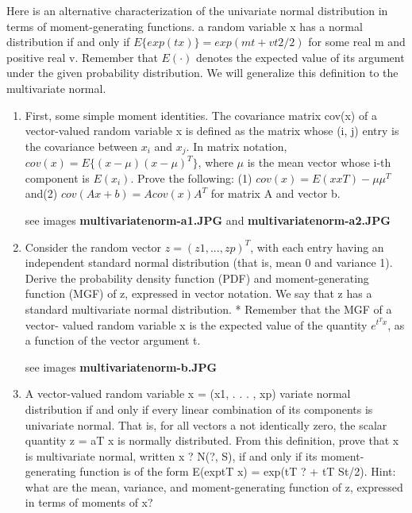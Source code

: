 \documentclass{homework}
\begin{document}
\par \noindent Here is an alternative characterization of the univariate normal distribution in terms of moment-generating functions.  a random variable x has a normal distribution if and only if $E \{exp(tx)\} = exp(mt + vt2/2)$ for some real m and positive real v. Remember that $E(\cdot)$ denotes the expected value of its argument under the given probability distribution. We will generalize this definition to the multivariate normal.


\begin{enumerate}[label=(\Alph*)]
\item First, some simple moment identities. The covariance matrix cov(x) of a vector-valued random variable x is defined as the matrix whose (i, j) entry is the covariance between $x_i$ and $x_j$. In matrix notation, $cov(x) = E\{(x - \mu)(x - \mu)^T\}$, where $\mu$ is the mean vector whose i-th component is $E(x_i)$. Prove the following: (1) $cov(x) = E(xxT) - \mu\mu^T$ and(2) $cov(Ax + b) = Acov(x)A^T$ for matrix A and vector b.

\par * see images \textbf{multivariatenorm-a1.JPG} and \textbf{multivariatenorm-a2.JPG}

\item Consider the random vector $z = (z1, . . . , zp)^T$, with each entry having an independent standard normal distribution (that is, mean 0 and variance 1). Derive the probability density function (PDF) and moment-generating function (MGF) of z, expressed in vector notation.  We say that z has a standard multivariate normal distribution. * Remember that the MGF of a vector- valued random variable x is the expected value of the quantity $e^{t^T x}$, as a function of the vector argument t.

\par * see images \textbf{multivariatenorm-b.JPG}

\item A vector-valued random variable x = (x1, . . . , xp)
variate normal distribution if and only if every linear combination of its components is univariate normal. That is, for all vectors a not identically zero, the scalar quantity z = aT x is normally distributed. From this definition, prove that x is multivariate normal, written
x ? N(?, S), if and only if its moment-generating function is of the form E(exp{tT x}) = exp(tT ? + tT St/2). Hint: what are the mean, variance, and moment-generating function of z, expressed in terms of moments of x?


\end{enumerate}
\end{document}
